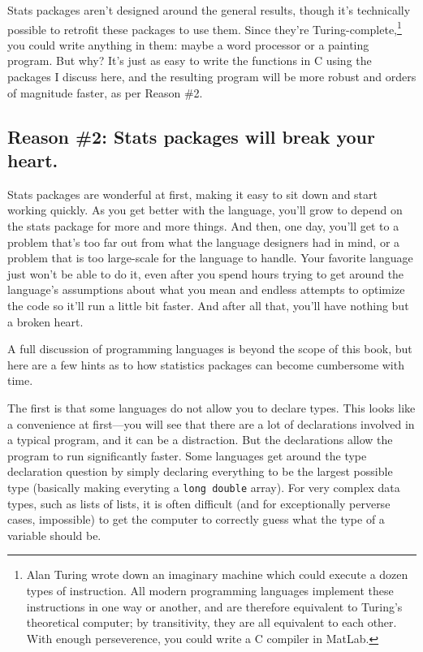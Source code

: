Stats packages aren't designed around the general results, though
it's technically possible to retrofit these packages to use them. Since
they're Turing-complete,\footnote{Alan Turing wrote down an imaginary
machine which could execute a dozen types of instruction.  All
modern programming languages implement these instructions in one way or
another, and are therefore equivalent to Turing's theoretical computer;
by transitivity, they are all equivalent to each other. With enough
perseverence, you could
write a C compiler in MatLab.} you could
write anything in them: maybe a word processor or a painting program. But
why? It's just as easy to write the functions in C using the packages I discuss
here, and the resulting program will be more robust and orders of
magnitude faster, as per Reason \#2.
	\fi

\subsection{Reason \#2: Stats packages will break your heart.} Stats packages
are wonderful at first, making it easy to sit down and start working
quickly. As you get better with the language, you'll 
grow to depend on the stats package for more and more
things. And then, one day, you'll get to a problem that's too far
out from what the language designers had in mind, or a problem that is
too large-scale for the language to handle. Your favorite language just
won't be able to do it, even after you spend hours trying to get around
the language's assumptions about what you mean and endless attempts to
optimize the code so it'll run a little bit faster. And after all that,
you'll have nothing but a broken heart.

A full discussion of programming languages is beyond the scope of this book, but
here are a few hints as to how statistics packages can become cumbersome with
time. 

The first is that some languages do not allow you to declare types. This
looks like a convenience at first---you will see that there are a
lot of declarations involved in a typical program, and it can be a
distraction. But the declarations allow the program to run significantly
faster. Some languages get around the type declaration question by simply
declaring everything to be the largest possible type (basically making
everyting a {\tt long double} array).  For very complex data types,
such as lists of lists, it is often difficult (and for exceptionally
perverse cases, impossible) to get the computer to correctly guess what the
type of a variable should be.

